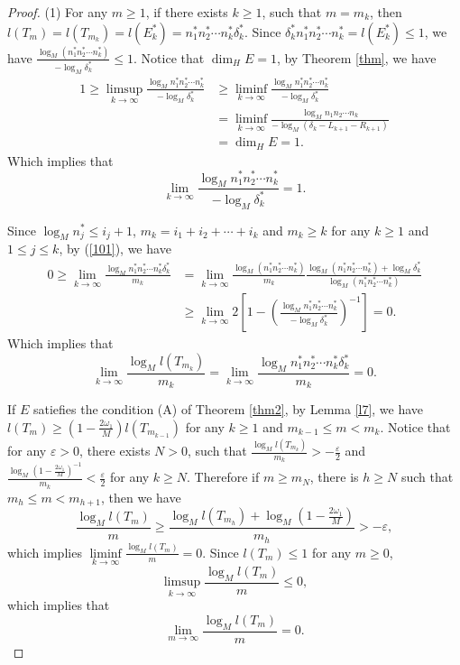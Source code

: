 \documentclass[10pt,a4paper]{amsart}
\begin{document}
\begin{proof}
(1)
For any $m\ge 1$, if there exists $k\ge1$, such that $m=m_{k}$, then $l(T_m )=l(T_{m_k}) =l(E^*_k)=n^*_1n^*_2\cdots n^*_k\delta^*_k$. Since $\delta^*_kn^*_1n^*_2\cdots n^*_k=l(E^*_k)\le 1$, we have $\frac{\log_M(n^*_1n^*_2\cdots n^*_k)}{-\log_M\delta^*_k}\le 1.$ Notice that $\dim_{H}E=1$, by Theorem \ref{thm}, we have
\begin{equation}\begin{aligned}
1\ge\limsup\limits_{k \to\infty}  \frac{\log_M n^*_1n^*_2\cdots n^*_k}{-\log_M\delta^*_k}&\ge\liminf\limits_{k \to\infty}  \frac{\log_M n^*_1n^*_2\cdots n^*_k}{-\log_M\delta^*_k}\\& =\liminf\limits_{k \to\infty}  \frac{\log_M n_1n_2\cdots n_k}{-\log_M(\delta_k-L_{k+1}-R_{k+1})}\\& =\dim_{H}E=1.
\end{aligned}
\end{equation}
Which implies that \begin{equation}\label{101}
\lim_{k \to\infty}  \frac{\log_M n^*_1n^*_2\cdots n^*_k}{-\log_M\delta^*_k}=1.
\end{equation}

Since $\log_Mn^*_j\le i_j+1$, $m_k=i_1+i_2+\cdots+i_k$ and $m_k\ge k$ for any $k\ge 1$ and $1\le j \le k$, by (\ref{101}), we have
\begin{equation*}
\begin{aligned}
0\ge\lim_{k \to \infty} \frac{\log_M n^*_1n^*_2\cdots n^*_k\delta^*_k}{m_k} & = \lim_{k \to \infty}\frac{\log_M(n^*_1n^*_2\cdots n^*_k)}{m_k}\frac{\log_M(n^*_1n^*_2\cdots n^*_k)+\log_M\delta^*_k}{\log_M(n^*_1n^*_2\cdots n^*_k)}\\
&\ge \lim_{k \to \infty}2[1-( \frac{\log_M n^*_1n^*_2\cdots n^*_k}{-\log_M\delta^*_k})^{-1}]
=0.
\end{aligned}
\end{equation*}
Which implies that \begin{equation}\label{102}
\lim_{k \to \infty}\frac{\log_{M}l(T_{m_k}) }{m_k}=\lim_{k \to \infty} \frac{\log_M n^*_1n^*_2\cdots n^*_k\delta^*_k}{m_k}=0.
\end{equation}

If $E$ satiefies the condition {\rm(A)} of Theorem {\rm\ref{thm2}}, by Lemma \ref{l7}, we have $l(T_m) \ge(1-\frac{2\omega_1}{M})l(T_{m_{k-1}})$ for any $k\ge1 $ and $m_{k-1}\le m<m_k$. Notice that for any $\varepsilon>0$, there exists $N>0$, such that
$\frac{\log_{M} l(T_{m_k}) }{m_k}>-\frac{\varepsilon }{2} $ and $\frac{\log_{M}(1-\frac{2\omega_1}{M})^{-1} }{m_k}<\frac{\varepsilon }{2} $ for any $k\ge N$.
 Therefore if $m\ge m_{N}$, there is $h\ge N$ such that $m_h \le m < m_{h+1}$, then we have $$\frac{\log_M l(T_m)}{m}\ge\frac{\log_M l(T_{m_h})+\log_M(1-\frac{2\omega_1}{M})}{m_h}>-\varepsilon ,$$
which implies $\liminf\limits_{k \to\infty}   \frac{\log_M l(T_m ) }{m}=0$.
Since $l(T_m)\le 1$ for any $m\ge 0$,
$$\limsup\limits_{k \to\infty}  \frac{\log_M l(T_m) }{m}\le 0,$$ which implies that $$\lim_{m \to \infty} \frac{\log_M l(T_m) }{m}=0.$$







\end{proof}
\end{document}
